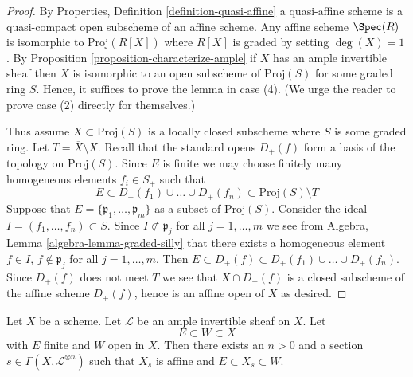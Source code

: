 \begin{proof}
By Properties, Definition \ref{definition-quasi-affine}
a quasi-affine scheme is a quasi-compact open subscheme
of an affine scheme. Any affine scheme $\Spec(R)$ is isomorphic to
$\text{Proj}(R[X])$ where $R[X]$ is graded by setting $\deg(X) = 1$.
By Proposition \ref{proposition-characterize-ample}
if $X$ has an ample invertible sheaf then $X$ is isomorphic to an open
subscheme of $\text{Proj}(S)$ for some graded ring $S$.
Hence, it suffices to prove the lemma in case (4).
(We urge the reader to prove case (2) directly for themselves.)

\medskip\noindent
Thus assume $X \subset \text{Proj}(S)$ is a locally closed subscheme
where $S$ is some graded ring. Let $T = \overline{X} \setminus X$.
Recall that the standard opens $D_{+}(f)$ form a basis of the
topology on $\text{Proj}(S)$. Since $E$ is finite we may choose finitely many
homogeneous elements $f_i \in S_{+}$ such that
$$
E \subset
D_{+}(f_1) \cup \ldots \cup D_{+}(f_n) \subset
\text{Proj}(S) \setminus T
$$
Suppose that $E = \{\mathfrak p_1, \ldots, \mathfrak p_m\}$
as a subset of $\text{Proj}(S)$.
Consider the ideal $I = (f_1, \ldots, f_n) \subset S$.
Since $I \not \subset \mathfrak p_j$ for all $j = 1, \ldots, m$
we see from Algebra, Lemma \ref{algebra-lemma-graded-silly} that
there exists a homogeneous element $f \in I$, $f \not \in \mathfrak p_j$
for all $j = 1, \ldots, m$. Then $E \subset D_{+}(f) \subset
D_{+}(f_1) \cup \ldots \cup D_{+}(f_n)$. Since $D_{+}(f)$ does not
meet $T$ we see that $X \cap D_{+}(f)$ is a closed subscheme of the
affine scheme $D_{+}(f)$, hence is an affine open of $X$ as desired.
\end{proof}

\begin{lemma}
\label{lemma-ample-finite-set-in-principal-affine}
Let $X$ be a scheme. Let $\mathcal{L}$ be an ample invertible sheaf on $X$.
Let
$$
E \subset W \subset X
$$
with $E$ finite and $W$ open in $X$. Then there exists an $n > 0$
and a section $s \in \Gamma(X, \mathcal{L}^{\otimes n})$ such that
$X_s$ is affine and $E \subset X_s \subset W$.
\end{lemma}

